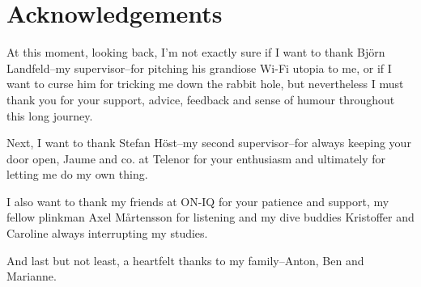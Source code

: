 \documentclass[11pt,twoside]{eitExjobb}
\begin{document}

	\MakeTitlePage
	\frontmatter

	\chapter*{Acknowledgements}
At this moment, looking back, I'm not exactly sure if I want to thank
Björn Landfeld–my supervisor–for pitching his grandiose Wi-Fi utopia to me, or 
if I want to curse him for tricking me down the rabbit hole, but nevertheless I must
thank you for your support, advice, feedback and sense of humour throughout 
this long journey. 

Next, I want to thank Stefan Höst–my second supervisor–for always keeping your
door open, Jaume and co. at Telenor for your enthusiasm and ultimately for 
letting me do my own thing.

I also want to thank my friends at ON-IQ for your patience and support, my fellow
plinkman Axel Mårtensson for listening and my dive buddies Kristoffer and Caroline
always interrupting my studies.

And last but not least, a heartfelt thanks to my family–Anton, Ben and Marianne.

	

	

	\tableofcontents
	\listoffigures
	\listoftables
	\cleardoublepage

	\mainmatter

		

		

		

		

		

		

		
		


	\appendix
\end{document}
